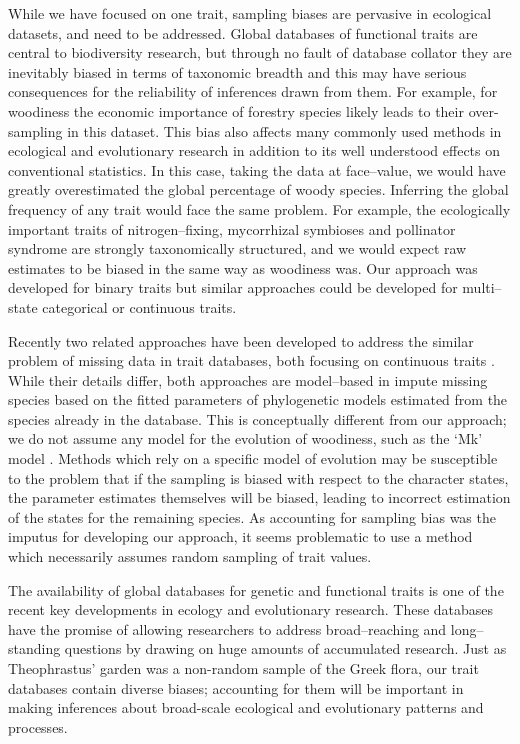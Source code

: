 \documentclass[a4paper,12pt]{article}
\begin{document}
While we have focused on one trait, sampling biases are pervasive in ecological datasets, and need to be addressed.
Global databases of functional traits
\citep[e.g., TRY;][]{kattge2011try} are central to biodiversity
research, but through no fault of database collator they are inevitably biased in terms of taxonomic breadth
and this may have serious consequences for the reliability of
inferences drawn from them.
For example, for woodiness the economic importance of forestry species
likely leads to their
over-sampling in this dataset.
This bias also affects many commonly used methods in ecological and evolutionary research \citep[e.g.,][]{ackerly2000taxon,nakagawa2008missing,pennell2013integrative, Pakeman2013} in addition to its well understood effects on conventional statistics.  In this case, taking the data at face--value, 
we would have greatly overestimated
the global percentage of woody species.  Inferring the global
frequency of any trait would face the same problem.  For
example, the ecologically important traits of nitrogen--fixing,
mycorrhizal symbioses and pollinator syndrome are strongly
taxonomically structured, and we would expect raw estimates to be
biased in the same way as woodiness was.  Our approach was developed
for binary traits
but similar approaches could be developed for multi--state categorical or continuous traits.

Recently two related approaches have been developed to address the similar problem
of missing data in trait databases, both focusing on continuous traits \citep{Swenson2013, PEM}. 
While their details differ, both approaches are model--based in impute missing species
based on the fitted parameters of
phylogenetic models estimated from
the species already in the database. This is conceptually different from our approach;
we do not assume any model for the evolution of woodiness, such as the `Mk' model \citep{Pagel1994}.
Methods which rely on a specific model
of evolution may be susceptible to the problem that if the sampling is biased with respect
to the character states, the parameter estimates themselves will be biased, leading 
to incorrect estimation of the states for the remaining species. As accounting for sampling bias
was the imputus for developing our approach, it seems problematic to use
a method which necessarily assumes random sampling of trait values.

The availability of global databases for genetic and functional traits is one of the recent key developments in ecology and evolutionary research.  These databases have the promise of allowing researchers to address broad--reaching and long--standing questions by drawing on huge amounts of accumulated research.  
Just as Theophrastus' garden was a non-random sample of the Greek
flora, our trait databases contain diverse biases; accounting for
them will be important in making inferences about broad-scale
ecological and evolutionary patterns and processes.
\end{document}
